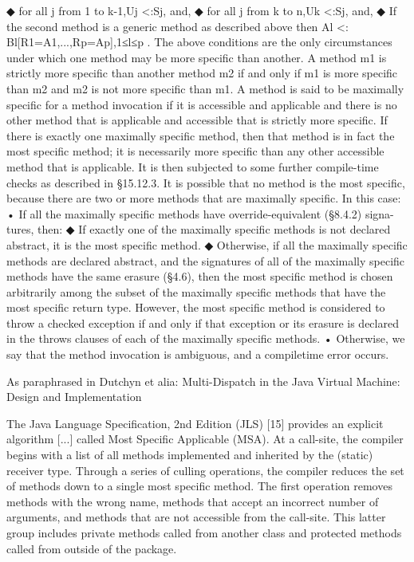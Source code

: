 ◆ for all j from 1 to k-1,Uj <:Sj, and,
◆ for all j from k to n,Uk <:Sj, and,
◆ If the second method is a generic method as described above then Al <: Bl[R1=A1,...,Rp=Ap],1≤l≤p .
The above conditions are the only circumstances under which one method may be more specific than another.
A method m1 is strictly more specific than another method m2 if and only if m1 is more specific than m2 and m2 is not more specific than m1.
A method is said to be maximally specific for a method invocation if it is accessible and applicable and there is no other method that is applicable and accessible that is strictly more specific.
If there is exactly one maximally specific method, then that method is in fact the most specific method; it is necessarily more specific than any other accessible method that is applicable. It is then subjected to some further compile-time checks as described in §15.12.3.
It is possible that no method is the most specific, because there are two or more methods that are maximally specific. In this case:
• If all the maximally specific methods have override-equivalent (§8.4.2) signa- tures, then:
◆ If exactly one of the maximally specific methods is not declared abstract, it is the most specific method.
◆ Otherwise, if all the maximally specific methods are declared abstract, and the signatures of all of the maximally specific methods have the same erasure (§4.6), then the most specific method is chosen arbitrarily among the subset of the maximally specific methods that have the most specific return type. However, the most specific method is considered to throw a checked exception if and only if that exception or its erasure is declared in the throws clauses of each of the maximally specific methods.
• Otherwise, we say that the method invocation is ambiguous, and a compiletime error occurs.

As paraphrased in Dutchyn et alia: Multi-Dispatch in the Java Virtual Machine: Design and Implementation

The Java Language Specification, 2nd Edition
(JLS) [15] provides an explicit algorithm [...] called Most Specific Applicable (MSA). At a call-site, the compiler begins with a list of all methods implemented and inherited by the (static) receiver type. Through a series of culling operations, the compiler reduces the set of methods down to a single most specific method. The first operation removes methods with the wrong name, methods that accept an incorrect number of arguments, and methods that are not accessible from the call-site. This latter group includes private methods called from another class and protected methods called from outside of the package.

